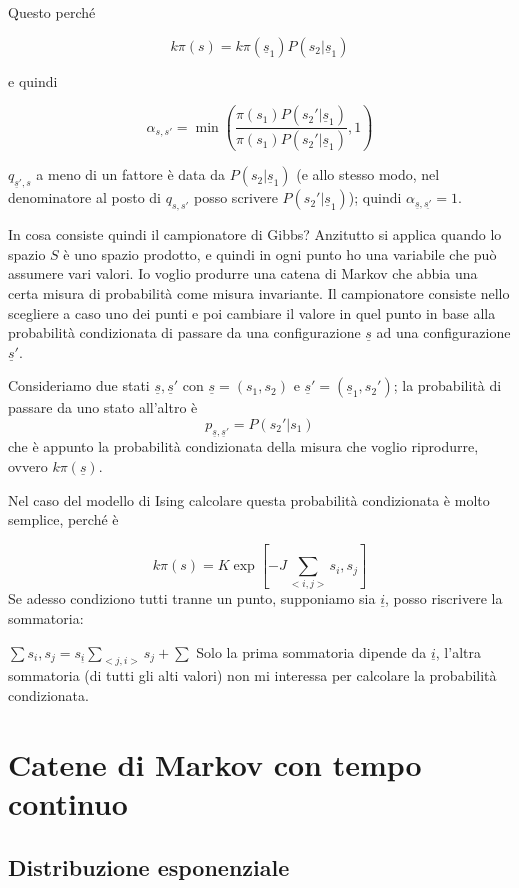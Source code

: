 \documentclass[a4paper,12pt]{book}
\begin{document}
Questo perché

$$ k\pi(s) = k\pi(\underline{s}_1)P(s_2 | \underline{s}_1) $$ 

e quindi 

$$ \alpha_{s,s'} = \min \left(\frac{\pi(s_1)P(s_2' | \underline{s}_1)}{\pi(s_1)P(s_2' | \underline{s}_1)}, 1\right) $$

$ q_{\underline{s}', s} $ a meno di un fattore è data da $ P(s_2 | \underline{s}_1) $ (e allo stesso modo, nel denominatore al posto di $ q_{s,s'} $ posso scrivere $ P(s_2' | \underline{s}_1) $); quindi $\alpha_{\underline{s},\underline{s'}} = 1$. 

In cosa consiste quindi il campionatore di Gibbs? Anzitutto si applica quando lo spazio $ S $ è uno spazio prodotto, e quindi in ogni punto ho una variabile che può assumere vari valori. Io voglio produrre una catena di Markov che abbia una certa misura di probabilità come misura invariante. Il campionatore consiste nello scegliere a caso uno dei punti e poi cambiare il valore in quel punto in base alla probabilità condizionata di passare da una configurazione $ \underline{s} $ ad una configurazione $ \underline{s}' $. 

Consideriamo due stati $ \underline{s}, \underline{s}' $ con $ \underline{s} = (s_1, s_2) $ e $ \underline{s}' = (\underline{s}_1, s_2')$; la probabilità di passare da uno stato all'altro è 
$$ p_{\underline{s},\underline{s}'} = P(s_2' | s_1) $$
che è appunto la probabilità condizionata della misura che voglio riprodurre, ovvero $ k\pi(\underline{s}) $. 

Nel caso del modello di Ising calcolare questa probabilità condizionata è molto semplice, perché è 

$$ k\pi(s) = K \exp [-J \sum_{<i, j>} s_i, s_j] $$
Se adesso condiziono tutti tranne un punto, supponiamo sia $\underline{i}$, posso riscrivere la sommatoria:

$\sum s_i, s_j = s_{\underline{i}} \sum_{<j, i>} s_j + \sum$
Solo la prima sommatoria dipende da $ \underline{i} $, l'altra sommatoria (di tutti gli alti valori) non mi interessa per calcolare la probabilità condizionata.

\chapter{Catene di Markov con tempo continuo}

\section{Distribuzione esponenziale}
\end{document}
